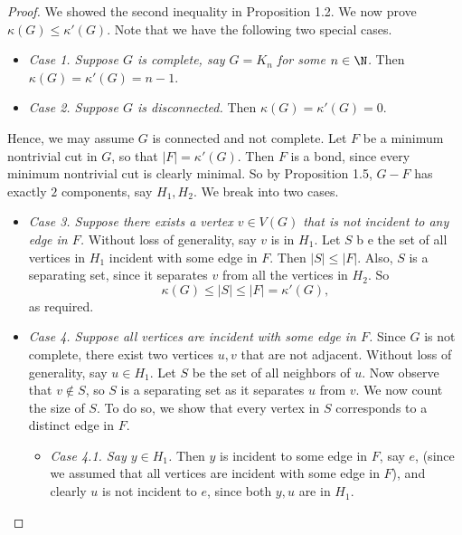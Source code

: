 \documentclass[co342]{subfiles}
\begin{document}
    \begin{proof}
        We showed the second inequality in Proposition 1.2. We now prove $\kappa\left( G \right) \leq \kappa'\left( G \right)$. Note that we have the following two special cases.
        \begin{itemize}
            \item \textit{Case 1. Suppose $G$ is complete, say $G=K_n$ for some $n\in\N$.} Then $\kappa\left( G \right) = \kappa'\left( G \right) = n-1$.
            \item \textit{Case 2. Suppose $G$ is disconnected.} Then $\kappa\left( G \right) = \kappa'\left( G \right) = 0$.
        \end{itemize} 
        Hence, we may assume $G$ is connected and not complete. Let $F$ be a minimum nontrivial cut in $G$, so that $\left| F \right| = \kappa'\left( G \right)$. Then $F$ is a bond, since every minimum nontrivial cut is clearly minimal. So by Proposition 1.5, $G-F$ has exactly $2$ components, say $H_1,H_2$. We break into two cases.
        \begin{itemize}
            \item \textit{Case 3. Suppose there exists a vertex $v\in V\left( G \right)$ that is not incident to any edge in $F$.} Without loss of generality, say $v$ is in $H_1$. Let $S$ b e the set of all vertices in $H_1$ incident with some edge in $F$. Then $\left| S \right| \leq \left| F \right|$. Also, $S$ is a separating set, since it separates $v$ from all the vertices in $H_2$. So
                \begin{equation*}
                    \kappa\left( G \right) \leq \left| S \right| \leq \left| F \right| = \kappa'\left( G \right) ,
                \end{equation*}
                as required.
            \item \textit{Case 4. Suppose all vertices are incident with some edge in $F$.} Since $G$ is not complete, there exist two vertices $u,v$ that are not adjacent. Without loss of generality, say $u\in H_1$. Let $S$ be the set of all neighbors of $u$. Now observe that $v\notin S$, so $S$ is a separating set as it separates $u$ from $v$. We now count the size of $S$. To do so, we show that every vertex in $S$ corresponds to a distinct edge in $F$.
                \begin{itemize}
                    \item \textit{Case 4.1. Say $y\in H_1$.} Then $y$ is incident to some edge in $F$, say $e$, (since we assumed that all vertices are incident with some edge in $F$), and clearly $u$ is not incident to $e$, since both $y,u$ are in $H_1$.

\end{itemize}
\end{itemize}
\end{proof}
\end{document}

